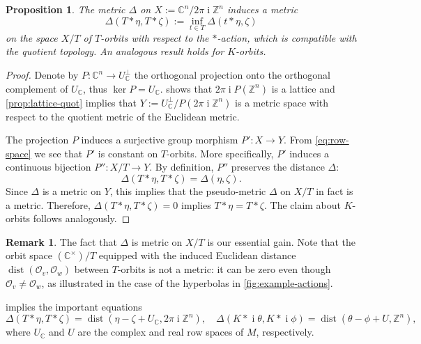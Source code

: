 \documentclass[10pt,a4paper]{article}
\newtheorem{proposition}[theorem]{Proposition}
\theoremstyle{definition}
\newtheorem{remark}[theorem]{Remark}
\DeclareMathOperator{\ii}{i}
\DeclareMathOperator{\dist}{dist}
\newcommand{\CC}{\mathbb{C}}
\newcommand{\ZZ}{\mathbb{Z}}
\newcommand{\OO}{\ensuremath{\mathcal{O}}}
\numberwithin{equation}{section}
\begin{document}
\begin{proposition}\label{prop:delta-is-a-metric}
The metric $\Delta$ on $X:=\CC^n/2\pi\ii\ZZ^n$ induces a metric
$$
 \Delta(T\ast \eta, T\ast \zeta) := \inf_{t\in T} \Delta( t\ast \eta,\zeta)
$$
on the space $X/T$ of $T$-orbits with respect to the $\ast$-action,
which is compatible with the quotient topology.
An analogous result holds for $K$-orbits.
\end{proposition}

\begin{proof}

Denote by $P:\CC^n\rightarrow U_\CC^\perp$ the orthogonal projection onto the orthogonal complement of $U_\CC$,
thus $\ker P = U_\CC$.
 shows that $2\pi\ii P(\ZZ^n)$ is a lattice
and \cref{prop:lattice-quot} implies that
$Y := U_\CC^\perp/P(2\pi\ii\ZZ^n)$
is a metric space with respect to the quotient metric of the Euclidean metric.

The projection $P$ induces a surjective group morphism
$P'\colon X \to Y$.
From \cref{eq:row-space} we see that $P'$
is constant on $T$-orbits. More specifically,
$P'$ induces a continuous bijection
$P''\colon X/T \to Y$.
By definition, $P''$ preserves the distance $\Delta$:
$$
 \Delta(T\ast \eta, T\ast \zeta) = \Delta(\eta, \zeta) .
$$
Since $\Delta$ is a metric on $Y$, this implies that
the pseudo-metric $\Delta$ on $X/T$ in fact is a metric.
Therefore, $\Delta(T\ast\eta,T\ast\zeta)=0$ implies $T\ast\eta=T\ast\zeta$.
The claim about $K$-orbits follows analogously.
\end{proof}

\begin{remark}
The fact that $\Delta$ is metric on $X/T$ is our essential gain.
Note that the orbit space $(\CC^\times)/T$ equipped with the induced
Euclidean distance $\dist(\OO_v,\OO_w)$ between $T$-orbits
is not a metric: it can be zero even though $\OO_v\neq\OO_w$,
as illustrated in the case of the hyperbolas in \cref{fig:example-actions}.
\end{remark}

 implies the important equations
\begin{equation}\label{eq:Delta=dist}
 \Delta(T\ast\eta,T\ast \zeta) = \dist( \eta-\zeta + U_\CC , 2\pi\ii\ZZ^n) ,\quad
 \Delta(K\ast \ii\theta, K\ast \ii\phi) = \dist(\theta-\phi + U, \ZZ^n) ,
\end{equation}
where $U_\CC$ and $U$ are the complex and real row spaces  of $M$,
respectively.
\end{document}
